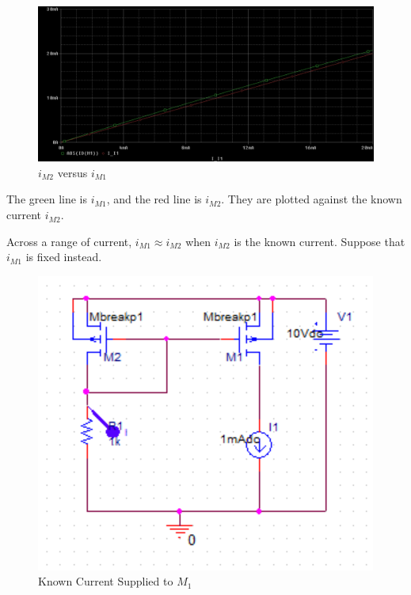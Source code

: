 \FloatBarrier

\FloatBarrier

\begin{figure}[h!]
	\centering
	\includegraphics[scale=0.50]{./images/plot_1.PNG}
	\caption{$i_{M2}$ versus $i_{M1}$}
	\label{fig:plot_1}
\end{figure}

\FloatBarrier

{\footnotesize The green line is $i_{M1}$, and the red line is $i_{M2}$. They are plotted against the known current $i_{M2}$.}

\FloatBarrier

Across a range of current, $i_{M1} \approx i_{M2}$ when $i_{M2}$ is the known current.
Suppose that $i_{M1}$ is fixed instead.

\FloatBarrier

\begin{figure}[h!]
	\centering
	\includegraphics[scale=0.75]{./images/thought_exp2.PNG}
	\caption{Known Current Supplied to $M_1$}
	\label{fig:thought_exp2}
\end{figure}

